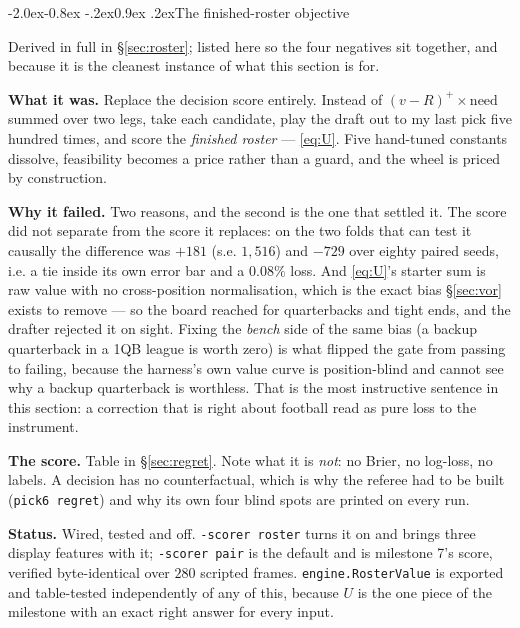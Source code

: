 \documentclass[10pt,a4paper]{article}
\makeatletter
\theoremstyle{plain}
\theoremstyle{definition}
\theoremstyle{remark}
\newcommand{\code}[1]{\texttt{\small #1}}
\renewcommand\subsection{\@startsection{subsection}{2}{\z@}%
  {-2.0ex\@plus -0.8ex \@minus -.2ex}{0.9ex \@plus .2ex}{\normalfont\large\bfseries}}
\makeatother
\begin{document}
\subsection{The finished-roster objective}
\label{sec:rosterfail}

Derived in full in \S\ref{sec:roster}; listed here so the four negatives sit together, and
because it is the cleanest instance of what this section is for.

\textbf{What it was.} Replace the decision score entirely. Instead of
$(v-R)^+ \times \mathrm{need}$ summed over two legs, take each candidate, play the draft
out to my last pick five hundred times, and score the \emph{finished roster} ---
\eqref{eq:U}. Five hand-tuned constants dissolve, feasibility becomes a price rather than
a guard, and the wheel is priced by construction.

\textbf{Why it failed.} Two reasons, and the second is the one that settled it. The score
did not separate from the score it replaces: on the two folds that can test it causally the
difference was $+181$ (s.e. $1{,}516$) and $-729$ over eighty paired seeds, i.e. a tie inside its own error bar and a $0.08\%$ loss. And
\eqref{eq:U}'s starter sum is raw value with no cross-position normalisation, which is the
exact bias \S\ref{sec:vor} exists to remove --- so the board reached for quarterbacks and
tight ends, and the drafter rejected it on sight. Fixing the \emph{bench} side of the same
bias (a backup quarterback in a 1QB league is worth zero) is what flipped the gate from
passing to failing, because the harness's own value curve is position-blind and cannot see
why a backup quarterback is worthless. That is the most instructive sentence in this
section: a correction that is right about football read as pure loss to the instrument.

\textbf{The score.} Table in \S\ref{sec:regret}. Note what it is \emph{not}: no Brier, no
log-loss, no labels. A decision has no counterfactual, which is why the referee had to be
built (\code{pick6 regret}) and why its own four blind spots are printed on every run.

\textbf{Status.} Wired, tested and off. \code{-scorer roster} turns it on and brings three
display features with it; \code{-scorer pair} is the default and is milestone 7's score,
verified byte-identical over $280$ scripted frames. \code{engine.RosterValue} is exported
and table-tested independently of any of this, because $U$ is the one piece of the
milestone with an exact right answer for every input.
\end{document}

